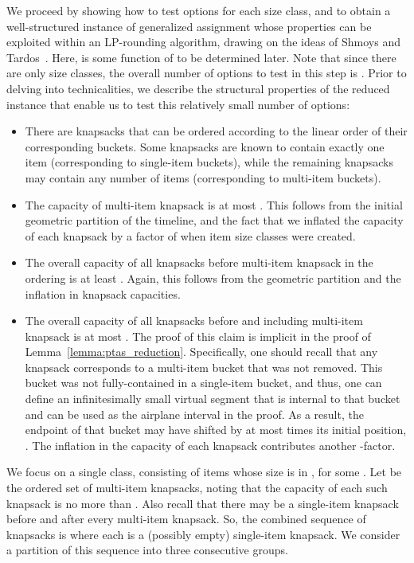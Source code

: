 \documentclass[11pt]{article}
\theoremstyle{plain}
\theoremstyle{definition}
\begin{document}
We proceed by showing how to test  options for each size class, and to obtain a well-structured instance of generalized assignment whose properties can be exploited within an LP-rounding algorithm, drawing on the ideas of Shmoys and Tardos~\cite{ShmoysT93}. Here,  is some function of  to be determined later. Note that since there are only  size classes, the overall number of options to test in this step is . Prior to delving into technicalities, we describe the structural properties of the reduced instance that enable us to test this relatively small number of options:
\begin{itemize} \label{items:properties_instance}
\item There are  knapsacks that can be ordered according to the linear order of their corresponding buckets. Some knapsacks are known to contain exactly one item (corresponding to single-item buckets), while the remaining knapsacks may contain any number of items (corresponding to multi-item buckets).

\item The capacity of multi-item knapsack  is at most . This follows from the initial geometric partition of the timeline, and the fact that we inflated the capacity of each knapsack by a factor of  when item size classes were created.

\item The overall capacity of all knapsacks before multi-item knapsack  in the ordering is at least . Again, this follows from the geometric partition and the inflation in knapsack capacities.

\item The overall capacity of all knapsacks before and including multi-item knapsack  is at most . The proof of this claim is implicit in the proof of Lemma~\ref{lemma:ptas_reduction}. Specifically, one should recall that any knapsack corresponds to a multi-item bucket that was not removed. This bucket was not fully-contained in a single-item bucket, and thus, one can define an infinitesimally small virtual segment that is internal to that bucket and can be used as the airplane interval in the proof. As a result, the endpoint of that bucket may have shifted by at most  times its initial position, . The inflation in the capacity of each knapsack contributes another -factor.
\end{itemize}

We focus on a single class, consisting of items whose size is in , for some . Let  be the ordered set of multi-item knapsacks, noting that the capacity of each such knapsack  is no more than . Also recall that there may be a single-item knapsack before and after every multi-item knapsack. So, the combined sequence of knapsacks is  where each  is a (possibly empty) single-item knapsack. We consider a partition of this sequence into three consecutive groups.
\end{document}
